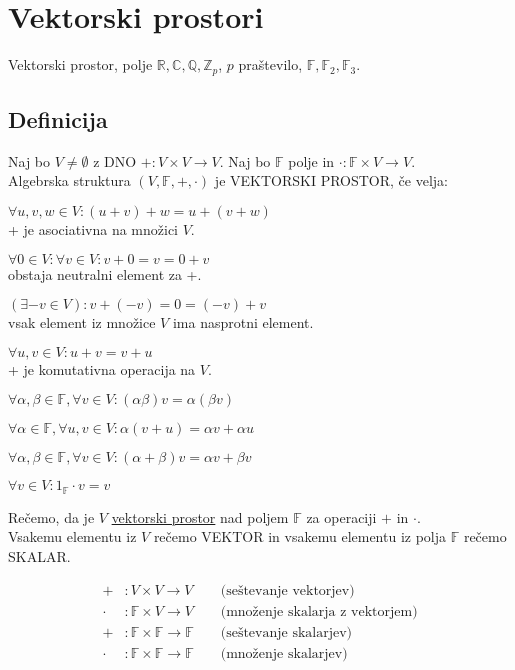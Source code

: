 
\section{Vektorski prostori}

Vektorski prostor, polje $\mathbb{R}, \mathbb{C}, \mathbb{Q}, \mathbb{Z}_p$, $p$ praštevilo, $\mathbb{F}, \mathbb{F}_2, \mathbb{F}_3$.

\subsection{Definicija}
Naj bo $V \ne \emptyset$ z DNO $+ : V \times V \to V$.
Naj bo $\mathbb{F}$ polje in $\cdot : \mathbb{F} \times V \to V$. \\
Algebrska struktura $(V, \mathbb{F}, +, \cdot)$ je VEKTORSKI PROSTOR, če velja:
\begin{vpenumerate}
    \item $\forall u, v, w \in V: (u + v) + w = u + (v + w)$ \\ + je asociativna na množici $V$.
    \item $\forall 0 \in V: \forall v \in V: v + 0 = v = 0 + v$ \\ obstaja neutralni element za +.
    \item $(\exists -v \in V): v + (-v) = 0 = (-v) + v$ \\ vsak element iz množice $V$ ima nasprotni element.
    \item $\forall u, v \in V: u + v = v + u$ \\ + je komutativna operacija na $V$.
    \item $\forall \alpha, \beta \in \mathbb{F}, \forall v \in V: (\alpha \beta)v = \alpha(\beta v)$
    \item $\forall \alpha \in \mathbb{F}, \forall u, v \in V: \alpha(v + u) = \alpha v + \alpha u$
    \item $\forall \alpha, \beta \in \mathbb{F}, \forall v \in V: (\alpha + \beta)v = \alpha v + \beta v$
    \item $\forall v \in V: 1_{\mathbb{F}} \cdot v = v$
\end{vpenumerate}
Rečemo, da je $V$ \underline{vektorski prostor} nad poljem $\mathbb{F}$ za operaciji $+$ in $\cdot$. \\[1em]
Vsakemu elementu iz $V$ rečemo VEKTOR in vsakemu elementu iz polja $\mathbb{F}$ rečemo SKALAR.

\begin{align*}
    + &: V \times V \to V &&\text{ (seštevanje vektorjev)} \\
    \cdot &: \mathbb{F} \times V \to V &&\text{ (množenje skalarja z vektorjem)} \\
    + &: \mathbb{F} \times \mathbb{F} \to \mathbb{F} &&\text{ (seštevanje skalarjev)} \\
    \cdot &: \mathbb{F} \times \mathbb{F} \to \mathbb{F} &&\text{ (množenje skalarjev)}
\end{align*}

